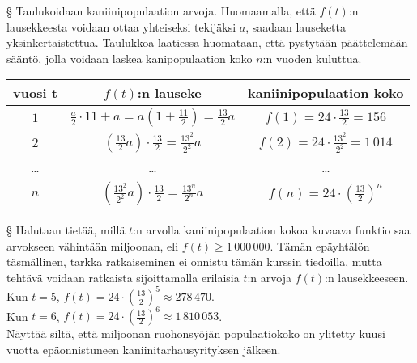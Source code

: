\begin{esimerkki}
\begin{esimratk}
{§ Taulukoidaan kaniinipopulaation arvoja. Huomaamalla, että $f(t)$:n lausekkeesta voidaan ottaa yhteiseksi tekijäksi $a$, saadaan lauseketta yksinkertaistettua. Taulukkoa laatiessa huomataan, että pystytään päättelemään sääntö, jolla voidaan laskea kanipopulaation koko $n$:n vuoden kuluttua.

\begin{tabular}{|c|c|c|}                                                     \hline
\textbf{vuosi t} & \textbf{$f(t)$:n lauseke} & \textbf{kaniinipopulaation koko}\\ \hline
$1$ &   $\frac{a}{2}\cdot11 + a = a(1+\frac{11}{2}) = \frac{13}{2}a$ & $f(1)=24\cdot\frac{13}{2}= 156$ \\ \hline 
$2$ &   $\left(\frac{13}{2}a\right)\cdot\frac{13}{2}= \frac{13^2}{2^2}a$  & $f(2)=24\cdot\frac{13^2}{2^2}= 1\,014$\\ \hline 
\ldots  & 		\ldots	&	\ldots	 \\ \hline
$n$ &   $\left(\frac{13^2}{2^2}a\right)\cdot\frac{13}{2} = \frac{13^n}{2^n}a$   & $f(n)=24\cdot\left(\frac{13}{2}\right)^n$\\ \hline 
    \end{tabular}
 
§ Halutaan tietää, millä $t$:n arvolla kaniinipopulaation kokoa kuvaava funktio saa arvokseen vähintään miljoonan, eli $f(t)\geq1\,000\,000$. Tämän epäyhtälön täsmällinen, tarkka ratkaiseminen ei onnistu tämän kurssin tiedoilla, mutta tehtävä voidaan ratkaista sijoittamalla erilaisia $t$:n arvoja $f(t)$:n lausekkeeseen.\\
Kun $t=5$, $f(t)=24\cdot\left(\frac{13}{2}\right)^5 \approx 278\,470$. \\
Kun $t=6$, $f(t)=24\cdot\left(\frac{13}{2}\right)^6 \approx 1\,810\,053$. \\

Näyttää siltä, että miljoonan ruohonsyöjän populaatiokoko on ylitetty kuusi vuotta epäonnistuneen kaniinitarhausyrityksen jälkeen.
}
	\end{esimratk}
	\begin{esimvast}
	\end{esimvast}
\end{esimerkki}
